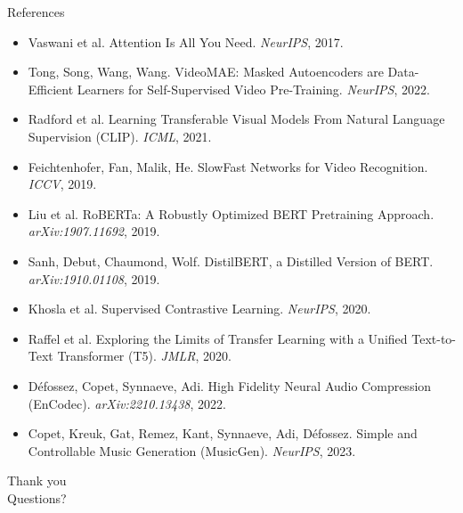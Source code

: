 \documentclass[aspectratio=169,11pt]{beamer}
\begin{document}
\begin{frame}{References}
\footnotesize
\begin{itemize}
  \item Vaswani et al. Attention Is All You Need. \emph{NeurIPS}, 2017.
  \item Tong, Song, Wang, Wang. VideoMAE: Masked Autoencoders are Data-Efficient Learners for
  Self-Supervised Video Pre-Training. \emph{NeurIPS}, 2022.
  \item Radford et al. Learning Transferable Visual Models From Natural Language Supervision
  (CLIP). \emph{ICML}, 2021.
  \item Feichtenhofer, Fan, Malik, He. SlowFast Networks for Video Recognition. \emph{ICCV}, 2019.
  \item Liu et al. RoBERTa: A Robustly Optimized BERT Pretraining Approach. \emph{arXiv:1907.11692}, 2019.
  \item Sanh, Debut, Chaumond, Wolf. DistilBERT, a Distilled Version of BERT. \emph{arXiv:1910.01108}, 2019.
  \item Khosla et al. Supervised Contrastive Learning. \emph{NeurIPS}, 2020.
  \item Raffel et al. Exploring the Limits of Transfer Learning with a Unified Text-to-Text
  Transformer (T5). \emph{JMLR}, 2020.
  \item Défossez, Copet, Synnaeve, Adi. High Fidelity Neural Audio Compression (EnCodec).
  \emph{arXiv:2210.13438}, 2022.
  \item Copet, Kreuk, Gat, Remez, Kant, Synnaeve, Adi, Défossez. Simple and Controllable Music
  Generation (MusicGen). \emph{NeurIPS}, 2023.
\end{itemize}
\end{frame}

\begin{frame}
\begin{center}
{\Huge Thank you}\\[6mm]
{\large Questions?}
\end{center}
\end{frame}
\end{document}

